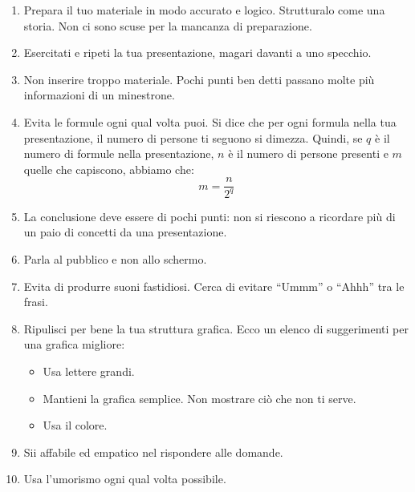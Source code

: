 \documentclass[12pt]{article}
\begin{document}
\begin{enumerate}

\item Prepara il tuo materiale in modo accurato e logico. Strutturalo come una storia. Non ci sono scuse per la mancanza di preparazione.

\item Esercitati e ripeti la tua presentazione, magari davanti a uno specchio.

\item Non inserire troppo materiale. Pochi punti ben detti passano molte pi\`{u} informazioni di un minestrone.

\item Evita le formule ogni qual volta puoi. Si dice che per ogni formula nella tua presentazione, il numero di persone ti seguono si dimezza. Quindi, se $q$ \`{e} il numero di formule nella presentazione, $n$ \`{e} il numero di persone presenti e $m$ quelle che capiscono, abbiamo che:
\begin{equation}
m =   \frac{n}{2^q}
\end{equation}

\item La conclusione deve essere di pochi punti: non si riescono a ricordare pi\`{u} di un paio di concetti da una presentazione.

\item Parla al pubblico e non allo schermo.

\item Evita di produrre suoni fastidiosi. Cerca di evitare ``Ummm'' o ``Ahhh'' tra le frasi.

\item Ripulisci per bene la tua struttura grafica. Ecco un elenco di suggerimenti per una grafica migliore:

\begin{itemize}
\item Usa lettere grandi.

\item Mantieni la grafica semplice. Non mostrare ci\`{o} che non ti serve.

\item Usa il colore.

\end{itemize}

\item Sii affabile ed empatico nel rispondere alle domande.

\item Usa l'umorismo ogni qual volta possibile.

\end{enumerate}
\end{document}
